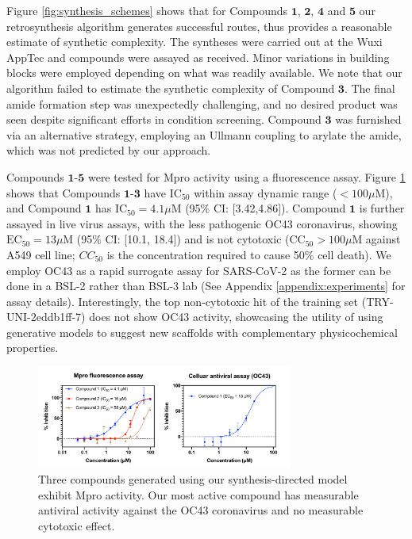 Figure \ref{fig:synthesis_schemes} shows that for Compounds $\mathbf{1}$, $\mathbf{2}$, $\mathbf{4}$ and $\mathbf{5}$ our retrosynthesis algorithm generates successful routes, thus provides a reasonable estimate of synthetic complexity. The syntheses were carried out at the Wuxi AppTec and compounds were assayed as received. Minor variations in building blocks were employed depending on what was readily available. We note that our algorithm failed to estimate the synthetic complexity of Compound $\mathbf{3}$. The final amide formation step was unexpectedly challenging, and no desired product was seen despite significant efforts in condition screening. Compound $\mathbf{3}$ was furnished via an alternative strategy, employing an Ullmann coupling to arylate the amide, which was not predicted by our approach. 

Compounds $\mathbf{1}$-$\mathbf{5}$ were tested for Mpro activity using a fluorescence assay. Figure \ref{fig:data} shows that Compounds $\mathbf{1}$-$\mathbf{3}$ have $\mathrm{IC}_{50}$ within assay dynamic range ($<100 \mu$M), and Compound $\mathbf{1}$ has $\mathrm{IC}_{50} = 4.1 \mu$M (95\% CI: [3.42,4.86]). Compound $\mathbf{1}$ is further assayed in live virus assays, with the less pathogenic OC43 coronavirus, showing $\mathrm{EC}_{50} = 13 \mu$M (95\% CI: [10.1, 18.4]) and is not cytotoxic ($\mathrm{CC}_{50}>100 \mu$M against A549 cell line; $CC_{50}$ is the concentration required to cause 50\% cell death). We employ OC43 as a rapid surrogate assay for SARS-CoV-2 as the former can be done in a BSL-2 rather than BSL-3 lab (See Appendix \ref{appendix:experiments} for assay details). Interestingly, the top non-cytotoxic hit of the training set (TRY-UNI-2eddb1ff-7) does not show OC43 activity, showcasing the utility of using generative models to suggest new scaffolds with complementary physicochemical properties. 

\begin{figure}[!bh]
    \centering
    \includegraphics[width=0.75\textwidth]{Chapters/Ranking/Figs/data_curve.pdf}
    \caption{Three compounds generated using our synthesis-directed model exhibit Mpro activity. Our most active compound has measurable antiviral activity against the OC43 coronavirus and no measurable cytotoxic effect.}
    \label{fig:data}
\end{figure}

